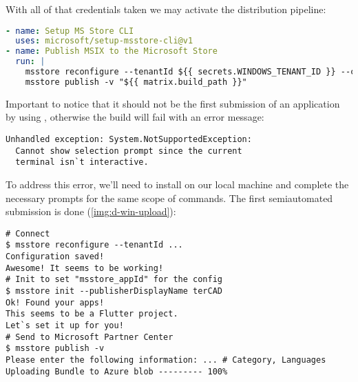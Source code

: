 
\noindent With all of that credentials taken we may activate the distribution pipeline:
\newpage
\begin{lstlisting}[language=yaml]
- name: Setup MS Store CLI
  uses: microsoft/setup-msstore-cli@v1
- name: Publish MSIX to the Microsoft Store
  run: |
    msstore reconfigure --tenantId ${{ secrets.WINDOWS_TENANT_ID }} --clientId ${{ secrets.WINDOWS_CLIENT_ID }} --clientSecret ${{ secrets.WINDOWS_SECRET }} --sellerId ${{ secrets.WINDOWS_SELLER_ID }}
    msstore publish -v "${{ matrix.build_path }}"
\end{lstlisting}

\noindent Important to notice that it should not be the first submission of an application by using , 
otherwise the build will fail with an error message:

\begin{lstlisting}[language=terminal]
Unhandled exception: System.NotSupportedException: 
  Cannot show selection prompt since the current 
  terminal isn`t interactive.
\end{lstlisting}

\noindent To address this error, we'll need to install  on our local machine and complete the necessary 
prompts for the same scope of commands. The first semiautomated submission is done (\cref{img:d-win-upload}):

\begin{lstlisting}[language=terminal]
# Connect
$ msstore reconfigure --tenantId ...
Configuration saved!
Awesome! It seems to be working!
# Init to set "msstore_appId" for the config
$ msstore init --publisherDisplayName terCAD
Ok! Found your apps!                    
This seems to be a Flutter project.
Let`s set it up for you!
# Send to Microsoft Partner Center
$ msstore publish -v
Please enter the following information: ... # Category, Languages
Uploading Bundle to Azure blob --------- 100%
\end{lstlisting}

